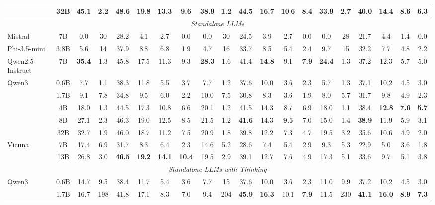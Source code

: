 \begin{table}[h]
{\begin{tabular}{lccccccc|cccccc|cccccc}
 & 32B & 45.1 & 2.2 & 48.6 & 19.8 & 13.3 & 9.6 & 38.9 & 1.2 & 44.5 & 16.7 & 10.6 & 8.4 & 33.9 & 2.7 & 40.0 & 14.4 & 8.6 & 6.3 \\
\midrule
\multicolumn{20}{c}{\textit{Standalone LLMs}} \\
\midrule
Mistral & 7B & 0.0 & 30 & 28.2 & 4.1 & 2.7 & 0.0 & 0.0 & 30 & 24.5 & 3.9 & 2.7 & 0.0 & 0.0 & 28 & 21.7 & 4.4 & 1.4 & 0.0 \\
Phi-3.5-mini & 3.8B & 5.6 & 14 & 37.9 & 8.8 & 6.8 & 1.9 & 4.7 & 16 & 33.7 & 8.5 & 5.4 & 2.4 & 9.7 & 15 & 32.2 & 7.7 & 4.8 & 2.2 \\
Qwen2.5-Instruct & 7B & \textbf{35.4} & 1.3 & 45.8 & 17.5 & 11.3 & 9.3 & \textbf{28.3} & 1.6 & 41.4 & \textbf{14.8} & 9.1 & \textbf{7.9} & \textbf{24.4} & 1.3 & 37.2 & 12.3 & 5.7 & 5.0 \\
\multirow{5}{*}{Qwen3} & 0.6B & 7.7 & 1.1 & 38.3 & 11.8 & 5.5 & 3.7 & 7.7 & 1.2 & 37.6 & 10.0 & 3.6 & 2.3 & 5.7 & 1.3 & 37.1 & 10.2 & 4.5 & 3.0 \\
 & 1.7B & 9.1 & 7.8 & 34.8 & 9.5 & 6.0 & 2.2 & 10.0 & 7.5 & 30.8 & 8.3 & 3.6 & 1.9 & 8.0 & 5.7 & 31.7 & 9.8 & 4.9 & 2.3 \\
 & 4B & 18.0 & 1.3 & 44.5 & 17.3 & 10.8 & 6.6 & 20.1 & 1.2 & 41.5 & 14.3 & 8.7 & 6.9 & 18.0 & 1.1 & 38.4 & \textbf{12.8} & \textbf{7.6} & \textbf{5.7} \\
 & 8B & 27.1 & 2.3 & 46.3 & 19.0 & 12.5 & 8.5 & 21.5 & 1.2 & \textbf{41.6} & 14.3 & \textbf{9.6} & 7.0 & 15.0 & 1.4 & \textbf{38.9} & 11.9 & 5.9 & 3.1 \\
 & 32B & 32.7 & 1.9 & 46.0 & 18.7 & 11.2 & 7.5 & 20.9 & 1.8 & 39.8 & 12.2 & 7.3 & 4.7 & 19.5 & 3.2 & 35.6 & 10.6 & 4.9 & 2.0 \\
\multirow{2}{*}{Vicuna} & 7B & 17.4 & 6.9 & 31.7 & 8.3 & 6.4 & 2.3 & 14.6 & 5.2 & 28.6 & 7.4 & 5.4 & 2.9 & 9.3 & 5.3 & 22.9 & 5.0 & 3.6 & 1.8 \\
 & 13B & 26.8 & 3.0 & \textbf{46.5} & \textbf{19.2} & \textbf{14.1} & \textbf{10.4} & 19.5 & 2.9 & 39.1 & 12.7 & 7.6 & 4.9 & 17.3 & 5.1 & 33.6 & 9.7 & 5.1 & 3.8 \\
\midrule
\multicolumn{20}{c}{\textit{Standalone LLMs with Thinking}} \\
\midrule
\multirow{5}{*}{Qwen3} & 0.6B & 14.7 & 9.5 & 38.4 & 11.7 & 5.4 & 3.6 & 7.7 & 15 & 37.6 & 10.0 & 3.6 & 2.3 & 11.0 & 9.9 & 37.2 & 10.2 & 4.5 & 3.0 \\
 & 1.7B & 16.7 & 198 & 41.8 & 17.1 & 8.3 & 7.0 & 9.4 & 204 & \textbf{45.9} & \textbf{16.3} & 10.1 & \textbf{7.9} & 11.5 & 230 & \textbf{41.1} & \textbf{16.0} & \textbf{8.9} & \textbf{7.3} \\

\end{tabular}}
\end{table}
